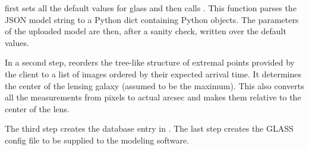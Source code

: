  first sets all the default values for glass and then calls .
This function parses the JSON model string to a Python dict containing Python objects.
The parameters of the uploaded model are then, after a sanity check, written over the default values.

In a second step,  reorders the tree-like structure of extremal points provided by the client to a list of images ordered by their expected arrival time. It determines the center of the lensing galaxy (assumed to be the maximum). This also converts all the measurements from \spl pixels to actual arcsec and makes them relative to the center of the lens.

The third step  creates the database entry in .
The last step  creates the GLASS config file to be supplied to the modeling software.










